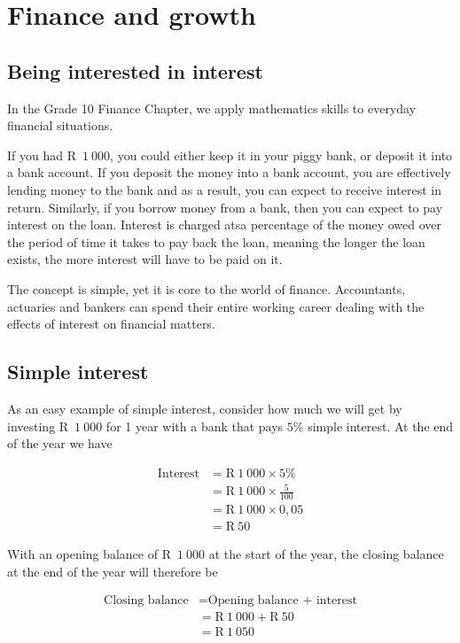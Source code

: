 \chapter{Finance and growth}

\section{Being interested in interest}

In the Grade 10 Finance Chapter, we apply mathematics skills to everyday financial situations.\par

If you had R~$1 ~000$, you could either keep it in your piggy bank, or deposit it into a bank account. If you deposit the
money into a bank account, you are effectively lending money to the bank and as a result, you can expect to receive
interest in return. Similarly, if you borrow money from a bank, then you can expect to pay interest on the loan.
Interest is charged atsa percentage of the money owed over the period of time it takes to pay back the loan, meaning
the longer the loan exists, the more interest will have to be paid on it.\par

The concept is simple, yet it is core to the world of finance. Accountants, actuaries and bankers can spend their
entire working career dealing with the effects of interest on financial matters.\par

\section{Simple interest}
  
As an easy example of simple interest, consider how much we will get by investing R~$1~000$ for 1 year with a bank that pays $5\%$ simple interest. At the end of the year we have\par
\begin{align*}
    \mbox{Interest} &= \text{R}~1~000 \times 5\%\\
    &= \text{R}~1~000 \times \frac{5}{100}\\
    &= \text{R}~1~000 \times 0,05\\
    &= \text{R}~50
\end{align*}

With an opening balance of R~$1~000$ at the start of the year, the closing balance at the end of the year will therefore be\par 
\begin{align*}
    \mbox{Closing balance} &= \mbox{Opening balance + interest}\\
    &= \text{R}~1~000 + \text{R}~50\\
    &= \text{R}~1~050
\end{align*}

